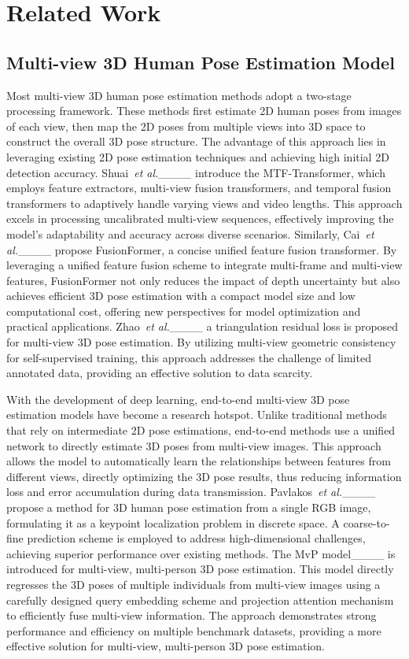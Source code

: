 \section{Related Work}
\subsection{Multi-view 3D Human Pose Estimation Model}
Most multi-view 3D human pose estimation methods adopt a two-stage processing framework. 
These methods first estimate 2D human poses from images of each view, then map the 2D poses from multiple views into 3D space to construct the overall 3D pose structure. 
The advantage of this approach lies in leveraging existing 2D pose estimation techniques and achieving high initial 2D detection accuracy. 
Shuai~\textit{et al.}____ introduce the MTF-Transformer, which employs feature extractors, multi-view fusion transformers, and temporal fusion transformers to adaptively handle varying views and video lengths. 
This approach excels in processing uncalibrated multi-view sequences, effectively improving the model's adaptability and accuracy across diverse scenarios.
Similarly, Cai~\textit{et al.}____ propose FusionFormer, a concise unified feature fusion transformer. 
By leveraging a unified feature fusion scheme to integrate multi-frame and multi-view features, FusionFormer not only reduces the impact of depth uncertainty but also achieves efficient 3D pose estimation with a compact model size and low computational cost, offering new perspectives for model optimization and practical applications. 
Zhao~\textit{et al.}____ a triangulation residual loss is proposed for multi-view 3D pose estimation. 
By utilizing multi-view geometric consistency for self-supervised training, this approach addresses the challenge of limited annotated data, providing an effective solution to data scarcity.

With the development of deep learning, end-to-end multi-view 3D pose estimation models have become a research hotspot. 
Unlike traditional methods that rely on intermediate 2D pose estimations, end-to-end methods use a unified network to directly estimate 3D poses from multi-view images. 
This approach allows the model to automatically learn the relationships between features from different views, directly optimizing the 3D pose results, thus reducing information loss and error accumulation during data transmission. 
Pavlakos~\textit{et al.}____ propose a method for 3D human pose estimation from a single RGB image, formulating it as a keypoint localization problem in discrete space.
A coarse-to-fine prediction scheme is employed to address high-dimensional challenges, achieving superior performance over existing methods.
The MvP model____ is introduced for multi-view, multi-person 3D pose estimation. 
This model directly regresses the 3D poses of multiple individuals from multi-view images using a carefully designed query embedding scheme and projection attention mechanism to efficiently fuse multi-view information. 
The approach demonstrates strong performance and efficiency on multiple benchmark datasets, providing a more effective solution for multi-view, multi-person 3D pose estimation.

